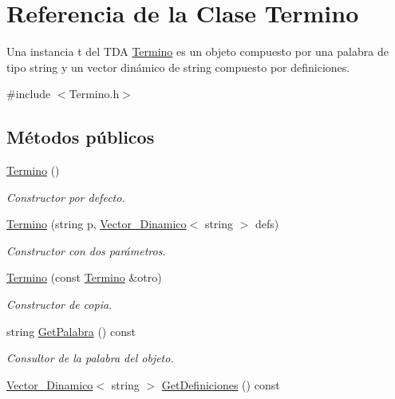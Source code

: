 \hypertarget{classTermino}{}\section{Referencia de la Clase Termino}
\label{classTermino}


Una instancia t del T\+DA \mbox{\hyperlink{classTermino}{Termino}} es un objeto compuesto por una palabra de tipo string y un vector dinámico de string compuesto por definiciones.  




{\ttfamily \#include $<$Termino.\+h$>$}

\subsection*{Métodos públicos}
\begin{DoxyCompactItemize}
\item 
\mbox{\label{classTermino_ac3b1425fec4d38d78c5d36cb5fe8e728}} 
\mbox{\hyperlink{classTermino_ac3b1425fec4d38d78c5d36cb5fe8e728}{Termino}} ()
\begin{DoxyCompactList}\small\item\em Constructor por defecto. \end{DoxyCompactList}\item 
\mbox{\hyperlink{classTermino_ab5f1715d66001733400d30345af815aa}{Termino}} (string p, \mbox{\hyperlink{classVector__Dinamico}{Vector\+\_\+\+Dinamico}}$<$ string $>$ defs)
\begin{DoxyCompactList}\small\item\em Constructor con dos parámetros. \end{DoxyCompactList}\item 
\mbox{\hyperlink{classTermino_a5614ae8912f6aabd677762cc6d10f2c8}{Termino}} (const \mbox{\hyperlink{classTermino}{Termino}} \&otro)
\begin{DoxyCompactList}\small\item\em Constructor de copia. \end{DoxyCompactList}\item 
string \mbox{\hyperlink{classTermino_a9cff6f16a62ffa3c8c2c241a33cbd04d}{Get\+Palabra}} () const
\begin{DoxyCompactList}\small\item\em Consultor de la palabra del objeto. \end{DoxyCompactList}\item 
\mbox{\hyperlink{classVector__Dinamico}{Vector\+\_\+\+Dinamico}}$<$ string $>$ \mbox{\hyperlink{classTermino_a19f98e7a2364068d2e6d99185d4f23d4}{Get\+Definiciones}} () const

\end{DoxyCompactItemize}
